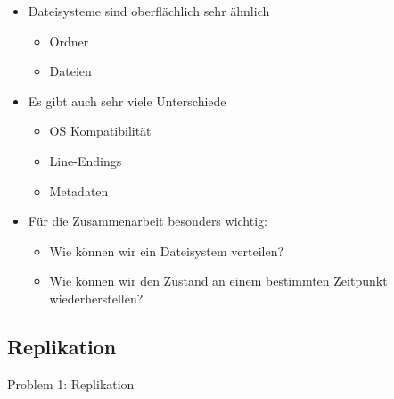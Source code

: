 \begin{frame}
    \slidehead
    \begin{itemize}[<+->]
        \item Dateisysteme sind oberflächlich sehr ähnlich
            \begin{itemize}
                \item Ordner
                \item Dateien
            \end{itemize}
        \item Es gibt auch sehr viele Unterschiede
            \begin{itemize}
                \item OS Kompatibilität
                \item Line-Endings
                \item Metadaten
            \end{itemize}
        \item Für die Zusammenarbeit besonders wichtig:
            \begin{itemize}
                \item Wie können wir ein Dateisystem verteilen?
                \item Wie können wir den Zustand an einem bestimmten Zeitpunkt wiederherstellen?
            \end{itemize}
    \end{itemize}
\end{frame}

\subsection{Replikation}\label{subsec:replikation}

\begin{frame}[c]
    \slidehead
    \centering
    \Large
    Problem 1: Replikation
\end{frame}

